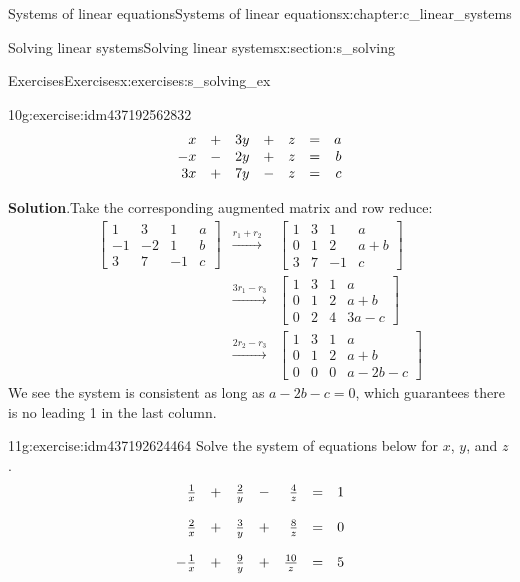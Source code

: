 \documentclass[oneside,10pt,]{book}
\makeatletter
\newcommand{\blocktitlefont}{\relax}
\numberwithin{equation}{section}
\newenvironment{linsys}[2][m]{
\begin{array}[#1]{@{}*{#2}{rc}r@{}}
}{
\end{array}}
\newcommand{\amp}{&}
\makeatother
\begin{document}
\begin{chapterptx}{Systems of linear equations}{}{Systems of linear equations}{}{}{x:chapter:c_linear_systems}
\begin{sectionptx}{Solving linear systems}{}{Solving linear systems}{}{}{x:section:s_solving}
\begin{exercises-subsection-numberless}{Exercises}{}{Exercises}{}{}{x:exercises:s_solving_ex}
\begin{divisionexercise}{10}{}{}{g:exercise:idm437192562832}
\begin{equation*}
\begin{linsys}{3} x\amp +\amp 3y\amp +\amp z\amp =\amp a\\ -x\amp -\amp 2y\amp +\amp z\amp =\amp b\\ 3x\amp +\amp 7y\amp -\amp z\amp =\amp c \end{linsys}
\end{equation*}
%
\par\smallskip%
\noindent\textbf{\blocktitlefont Solution}.\hypertarget{g:solution:idm437192605280}{}\quad{}Take the corresponding augmented matrix and row reduce:%
\begin{align*}
\begin{bmatrix}1\amp 3\amp 1\amp a\\ -1\amp -2\amp 1\amp b\\ 3\amp 7\amp -1\amp c \end{bmatrix} \amp \xrightarrow[]{r_1 + r_2}\amp \begin{bmatrix}1\amp 3\amp 1\amp a\\ 0\amp 1\amp 2\amp a+b\\ 3\amp 7\amp -1\amp c \end{bmatrix}\\
\amp \xrightarrow[]{3r_1 - r_3}\amp \begin{bmatrix}1\amp 3\amp 1\amp a\\ 0\amp 1\amp 2\amp a+b\\ 0\amp 2\amp 4\amp 3a-c \end{bmatrix}\\
\amp \xrightarrow[]{2r_2 - r_3}\amp \begin{bmatrix}\boxed{1}\amp 3\amp 1\amp a\\ 0\amp \boxed{1}\amp 2\amp a+b\\ 0\amp 0\amp 0\amp a-2b-c \end{bmatrix}
\end{align*}
We see the system is consistent as long as \(a-2b-c = 0\), which guarantees there is no leading 1 in the last column.%
\end{divisionexercise}%
\begin{divisionexercise}{11}{}{}{g:exercise:idm437192624464}%
Solve the system of equations below for \(x\), \(y\), and \(z\).%
\begin{equation*}
\begin{linsys}{3} \frac{1}{x}\amp +\amp \frac{2}{y}\amp -\amp \frac{4}{z}\amp =\amp 1\\ \\ \frac{2}{x}\amp +\amp \frac{3}{y}\amp +\amp \frac{8}{z}\amp =\amp 0\\ \\ -\frac{1}{x}\amp +\amp \frac{9}{y}\amp +\amp \frac{10}{z}\amp =\amp 5 \end{linsys}

\end{equation*}
\end{divisionexercise}
\end{exercises-subsection-numberless}
\end{sectionptx}
\end{chapterptx}
\end{document}
